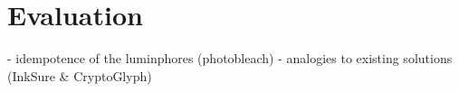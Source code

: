 \documentclass[thesis.tex]{subfiles}
\begin{document}
\chapter{Evaluation}
\label{chapter:evaluation}



- idempotence of the luminphores (photobleach)
- analogies to existing solutions (InkSure \& CryptoGlyph)
\end{document}

